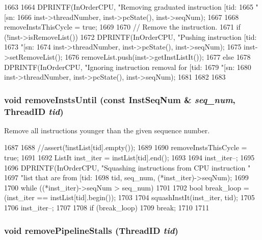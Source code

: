 \begin{DoxyCode}
1663 {
1664     DPRINTF(InOrderCPU, "Removing graduated instruction [tid:%
1665             "[sn:%
1666             inst->threadNumber, inst->pcState(), inst->seqNum);
1667 
1668     removeInstsThisCycle = true;
1669 
1670     // Remove the instruction.
1671     if (!inst->isRemoveList()) {            
1672         DPRINTF(InOrderCPU, "Pushing instruction [tid:%
1673                 "[sn:%
1674                 inst->threadNumber, inst->pcState(), inst->seqNum);
1675         inst->setRemoveList();        
1676         removeList.push(inst->getInstListIt());
1677     } else {
1678         DPRINTF(InOrderCPU, "Ignoring instruction removal for [tid:%
1679                 "[sn:%
1680                 inst->threadNumber, inst->pcState(), inst->seqNum);
1681     }
1682 
1683 }
\end{DoxyCode}
\hypertarget{classInOrderCPU_a79f7e36d4bd89fe4528b665a949a0023}{
\subsubsection[{removeInstsUntil}]{\setlength{\rightskip}{0pt plus 5cm}void removeInstsUntil (const {\bf InstSeqNum} \& {\em seq\_\-num}, \/  {\bf ThreadID} {\em tid})}}
\label{classInOrderCPU_a79f7e36d4bd89fe4528b665a949a0023}
Remove all instructions younger than the given sequence number. 


\begin{DoxyCode}
1687 {
1688     //assert(!instList[tid].empty());
1689 
1690     removeInstsThisCycle = true;
1691 
1692     ListIt inst_iter = instList[tid].end();
1693 
1694     inst_iter--;
1695 
1696     DPRINTF(InOrderCPU, "Squashing instructions from CPU instruction "
1697             "list that are from [tid:%
1698             tid, seq_num, (*inst_iter)->seqNum);
1699 
1700     while ((*inst_iter)->seqNum > seq_num) {
1701 
1702         bool break_loop = (inst_iter == instList[tid].begin());
1703 
1704         squashInstIt(inst_iter, tid);
1705 
1706         inst_iter--;
1707 
1708         if (break_loop)
1709             break;
1710     }
1711 }
\end{DoxyCode}
\hypertarget{classInOrderCPU_ace0d67fcac674ca759a8b0bc3acc7a05}{
\subsubsection[{removePipelineStalls}]{\setlength{\rightskip}{0pt plus 5cm}void removePipelineStalls ({\bf ThreadID} {\em tid})}}
\label{classInOrderCPU_ace0d67fcac674ca759a8b0bc3acc7a05}



